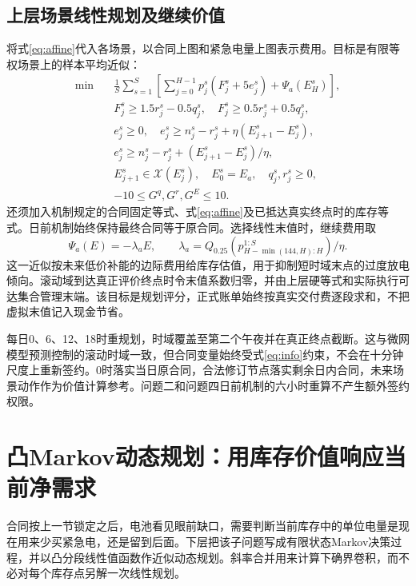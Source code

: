 \documentclass[UTF8,a4paper,zihao=-4,fontset=mac]{ctexart}
\begin{document}
\subsection{上层场景线性规划及继续价值}
将式\eqref{eq:affine}代入各场景，以合同上图和紧急电量上图表示费用。目标是有限等权场景上的样本平均近似\cite{kleywegt2002,shapiro2014}：
\begin{equation}\label{eq:saa}
\begin{aligned}
\min\quad&\frac1S\sum_{s=1}^S\left[\sum_{j=0}^{H-1}p_j^s(F_j^s+5e_j^s)+\Psi_a(E_H^s)\right],\\
&F_j^s\ge1.5r_j^s-0.5q_j^s,\quad F_j^s\ge0.5r_j^s+0.5q_j^s,\\
&e_j^s\ge0,\quad e_j^s\ge n_j^s-r_j^s+\eta(E_{j+1}^s-E_j^s),\\
&e_j^s\ge n_j^s-r_j^s+(E_{j+1}^s-E_j^s)/\eta,\\
&E_{j+1}^s\in\mathcal X(E_j^s),\quad E_0^s=E_a,\quad q_j^s,r_j^s\ge0,\\
&-10\le G^q,G^r,G^E\le10.
\end{aligned}
\end{equation}
还须加入机制规定的合同固定等式、式\eqref{eq:affine}及已抵达真实终点时的库存等式。日前机制始终保持最终合同等于原合同。选择线性末值时，继续费用取
\begin{equation}\label{eq:tail}
 \Psi_a(E)=-\lambda_a E,\qquad
 \lambda_a=Q_{0.25}(p_{H-\min(144,H):H}^{1:S})/\eta.
\end{equation}
这一近似按未来低价补能的边际费用给库存估值，用于抑制短时域末点的过度放电倾向。滚动域到达真正评价终点时令末值系数归零，并由上层硬等式和实际执行可达集合管理末端。该目标是规划评分，正式账单始终按真实交付费逐段求和，不把虚拟末值记入现金节省。

每日0、6、12、18时重规划，时域覆盖至第二个午夜并在真正终点截断。这与微网模型预测控制的滚动时域一致\cite{parisio2014,parisio2016}，但合同变量始终受式\eqref{eq:info}约束，不会在十分钟尺度上重新签约。0时落实当日原合同，合法修订节点落实剩余日内合同，未来场景动作作为价值计算参考。问题二和问题四日前机制的六小时重算不产生额外签约权限。

\section{凸Markov动态规划：用库存价值响应当前净需求}
合同按上一节锁定之后，电池看见眼前缺口，需要判断当前库存中的单位电量是现在用来少买紧急电，还是留到后面。下层把该子问题写成有限状态Markov决策过程\cite{puterman1994}，并以凸分段线性值函数作近似动态规划\cite{powell2011}。斜率合并用来计算下确界卷积，而不必对每个库存点另解一次线性规划。
\end{document}
